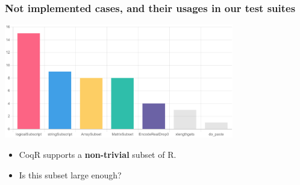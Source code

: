\documentclass{beamer}
\newcommand\emphb{\textbf}
\begin{document}




\begin{frame}
    \frametitle{Not implemented cases, and their usages in our test suites}

    \begin{center}
        \includegraphics[width=10cm]{images/not-implemented.png}
    \end{center}

    \begin{itemize}
      \item CoqR supports a \emphb{non-trivial} subset of R.
      \item Is this subset large enough?
    \end{itemize}

\end{frame}
\end{document}
